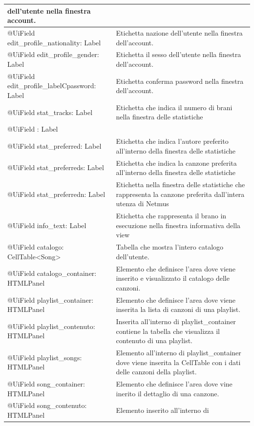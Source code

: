 \begin{longtable}{|p{}|p{}|}
dell'utente nella finestra account.\\\hline
@UiField edit\_profile\_nationality: Label & Etichetta 
nazione dell'utente nella finestra dell'account.\\\hline
@UiField edit\_profile\_gender: Label & Etichetta il sesso
dell'utente nella finestra dell'account.\\\hline
@UiField edit\_profile\_labelCpassword: Label & Etichetta conferma
password nella finestra dell'account.\\\hline
@UiField stat\_tracks: Label & Etichetta che indica il numero di brani
nella finestra delle statistiche\\\hline @UiField : Label & \\\hline
@UiField stat\_preferred: Label & Etichetta che indica l'autore
preferito all'interno della finestra delle statistiche\\\hline
@UiField stat\_preferreds: Label & Etichetta che indica la canzone
preferita all'interno della finestra delle statistiche\\\hline
@UiField stat\_preferredn: Label & Etichetta nella finestra delle statistiche
che rappresenta la canzone preferita dall'intera utenza di Netmus\\\hline
@UiField info\_text: Label & Etichetta che rappresenta il brano in
esecuzione nella finestra informativa della view\\\hline
@UiField catalogo: CellTable\textless Song\textgreater & Tabella che
mostra l'intero catalogo dell'utente.\\\hline
@UiField catalogo\_container: HTMLPanel & Elemento che definisce l'area
dove viene inserito e visualizzato il catalogo delle canzoni.\\\hline
@UiField playlist\_container: HTMLPanel & Elemento che definisce l'area
dove viene inserita la lista di canzoni di una playlist.\\\hline
@UiField playlist\_contenuto: HTMLPanel & Inserita all'interno di
playlist\_container contiene la tabella che visualizza il contenuto di
una playlist.\\\hline
@UiField playlist\_songs: HTMLPanel & Elemento all'interno di
playlist\_container dove viene inserita la CellTable con i dati delle
canzoni della playlist.\\\hline
@UiField song\_container: HTMLPanel & Elemento che definisce l'area dove
vine inerito il dettaglio di una canzone.\\\hline
@UiField song\_contenuto: HTMLPanel & Elemento inserito all'interno di

\end{longtable}
